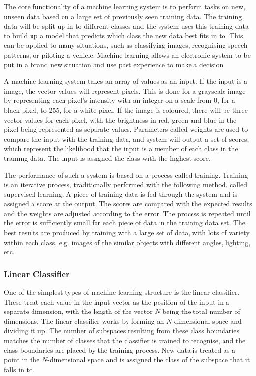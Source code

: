 \documentclass[12pt]{article}
\begin{document}
The core functionality of a machine learning system is to perform tasks on new, unseen data based on a large set of previously seen training data. The training data will be split up in to different classes and the system uses this training data to build up a model that predicts which class the new data best fits in to. This can be applied to many situations, such as classifying images, recognising speech patterns, or piloting a vehicle. Machine learning allows an electronic system to be put in a brand new situation and use past experience to make a decision.

A machine learning system takes an array of values as an input. If the input is a image, the vector values will represent pixels. This is done for a grayscale image by representing each pixel's intensity with an integer on a scale from 0, for a black pixel, to 255, for a white pixel. If the image is coloured, there will be three vector values for each pixel, with the brightness in red, green and blue in the pixel being represented as separate values. Parameters called weights are used to compare the input with the training data, and system will output a set of scores, which represent the likelihood that the input is a member of each class in the training data. The input is assigned the class with the highest score. 

The performance of such a system is based on a process called training.  Training is an iterative process, traditionally performed with the following method, called supervised learning. A piece of training data is fed through the system and is assigned a score at the output. The scores are compared with the expected results and the weights are adjusted according to the error. The process is repeated until the error is sufficiently small for each piece of data in the training data set. The best results are produced by training with a large set of data, with lots of variety within each class, e.g. images of the similar objects with different angles, lighting, etc.

\subsubsection{Linear Classifier}
\label{sec:Background-ML-LC}

One of the simplest types of machine learning structure is the linear classifier. These treat each value in the input vector as the position of the input in a separate dimension, with the length of the vector $N$ being the total number of dimensions. The linear classifier works by forming an $N$-dimensional space and dividing it up. The number of subspaces resulting from these class boundaries matches the number of classes that the classifier is trained to recognise, and the class boundaries are placed by the training process. New data is treated as a point in the $N$-dimensional space and is assigned the class of the subspace that it falls in to.
\end{document}
